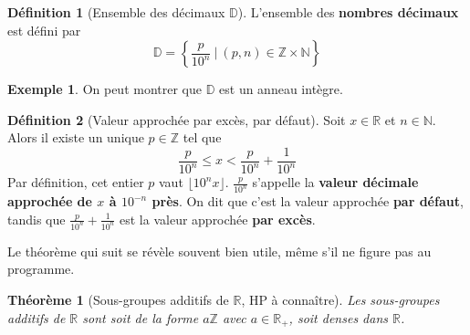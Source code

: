 \documentclass[french]{book}
\newcommand{\N}{\mathbb{N}}
\newcommand{\Z}{\mathbb{Z}}
\newcommand{\R}{\mathbb{R}}
\theoremstyle{plain}
\newtheorem{thm}{Théorème}[chapter]
\theoremstyle{definition}
\newtheorem{dfn}{Définition}[chapter]
\newtheorem{exa}{Exemple}[chapter]
\theoremstyle{remark}
\begin{document}
\begin{dfn}[Ensemble des décimaux $\mathbb{D}$]
	L'ensemble des \textbf{nombres décimaux} est défini par $$\mathbb{D}=\left\{\frac{p}{10^n} \ | \ (p,n)\in\Z\times\N\right\}$$
\end{dfn}
\begin{exa}
	On peut montrer que $\mathbb{D}$ est un anneau intègre.
\end{exa}
\begin{dfn}[Valeur approchée par excès, par défaut]
	Soit $x\in\R$ et $n\in\N$. Alors il existe un unique $p\in\Z$ tel que $$\frac{p}{10^n}\leqslant x<\frac{p}{10^n}+\frac{1}{10^n}$$ Par définition, cet entier $p$ vaut $\lfloor10^nx\rfloor$. $\displaystyle\frac{p}{10^n}$ s'appelle la \textbf{valeur décimale approchée de $x$ à $10^{-n}$ près}. On dit que c'est la valeur approchée \textbf{par défaut}, tandis que $\displaystyle\frac{p}{10^n}+\frac{1}{10^n}$ est la valeur approchée \textbf{par excès}.
\end{dfn}
Le théorème qui suit se révèle souvent bien utile, même s'il ne figure pas au programme.
\begin{thm}[Sous-groupes additifs de $\R$, HP à connaître]
	Les sous-groupes additifs de $\R$ sont soit de la forme $a\Z$ avec $a\in\R_+$, soit denses dans $\R$.
\end{thm}
\end{document}

